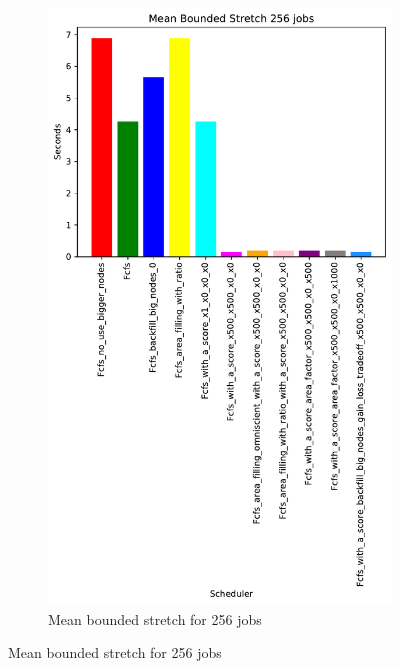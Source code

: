 \documentclass[a4paper]{article}
\begin{document}
\begin{figure}[H]
\begin{subfigure}[b]{0.4\linewidth}\centering\includegraphics[width=0.7\linewidth]{MBSS/plot/Results_Size_And_Data_2022-03-01->2022-03-03_V85105_Mean_Stretch_With_a_Minimum_256_450_128_32_256_4_1024.pdf}\caption{Mean bounded stretch for 256 jobs}\label{45}\end{subfigure}

\end{figure}
\end{document}

